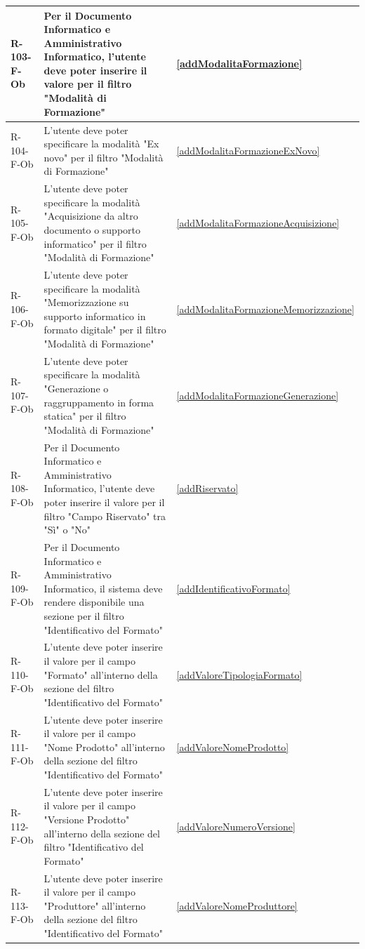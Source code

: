 \begin{longtable}{|p{2.5cm}|p{9.5cm}|p{2.5cm}|}
R-103-F-Ob & Per il Documento Informatico e Amministrativo Informatico, l'utente deve poter inserire il valore per il filtro "Modalità di Formazione" & \ref{addModalitaFormazione} \\
\hline
R-104-F-Ob & L'utente deve poter specificare la modalità "Ex novo" per il filtro "Modalità di Formazione" & \ref{addModalitaFormazioneExNovo} \\
\hline
R-105-F-Ob & L'utente deve poter specificare la modalità "Acquisizione da altro documento o supporto informatico" per il filtro "Modalità di Formazione" & \ref{addModalitaFormazioneAcquisizione} \\
\hline
R-106-F-Ob & L'utente deve poter specificare la modalità "Memorizzazione su supporto informatico in formato digitale" per il filtro "Modalità di Formazione" & \ref{addModalitaFormazioneMemorizzazione} \\
\hline
R-107-F-Ob & L'utente deve poter specificare la modalità "Generazione o raggruppamento in forma statica" per il filtro "Modalità di Formazione" & \ref{addModalitaFormazioneGenerazione} \\

\hline
R-108-F-Ob & Per il Documento Informatico e Amministrativo Informatico, l'utente deve poter inserire il valore per il filtro "Campo Riservato" tra "Sì" o "No" & \ref{addRiservato} \\
\hline
R-109-F-Ob & Per il Documento Informatico e Amministrativo Informatico, il sistema deve rendere disponibile una sezione per il filtro "Identificativo del Formato" & \ref{addIdentificativoFormato} \\
\hline
R-110-F-Ob & L'utente deve poter inserire il valore per il campo "Formato" all'interno della sezione del filtro "Identificativo del Formato" & \ref{addValoreTipologiaFormato} \\
\hline
R-111-F-Ob & L'utente deve poter inserire il valore per il campo "Nome Prodotto" all'interno della sezione del filtro "Identificativo del Formato" & \ref{addValoreNomeProdotto} \\
\hline
R-112-F-Ob & L'utente deve poter inserire il valore per il campo "Versione Prodotto" all'interno della sezione del filtro "Identificativo del Formato" & \ref{addValoreNumeroVersione} \\
\hline
R-113-F-Ob & L'utente deve poter inserire il valore per il campo "Produttore" all'interno della sezione del filtro "Identificativo del Formato" & \ref{addValoreNomeProduttore} \\
\hline


\end{longtable}
